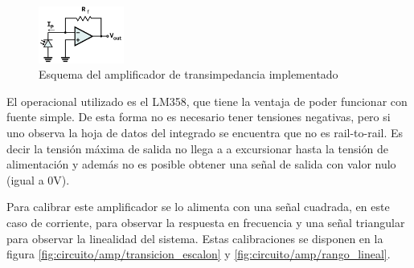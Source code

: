 \begin{figure}[H]
    \centering
    \includegraphics[width=0.25\textwidth]{fig/circuito/amp/TIA}
    \caption{Esquema del amplificador de transimpedancia implementado}
    \label{fig:circuito/tia}
\end{figure}

El operacional utilizado es el LM358, que tiene la ventaja de poder funcionar con fuente simple. De esta forma no es necesario tener tensiones negativas, pero si uno observa la hoja de datos del integrado se encuentra que no es rail-to-rail. Es decir la tensión máxima de salida no llega a a excursionar hasta la tensión de alimentación y además no es posible obtener una señal de salida con valor nulo (igual a 0V).

Para calibrar este amplificador se lo alimenta con una señal cuadrada, en este caso de corriente, para observar la respuesta en frecuencia y una señal triangular para observar la linealidad del sistema. Estas calibraciones se disponen en la figura \ref{fig:circuito/amp/transicion_escalon} y \ref{fig:circuito/amp/rango_lineal}.


